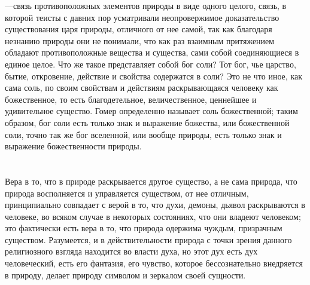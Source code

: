 \documentclass[12pt]{article}
\begin{document}
---связь противоположных элементов природы в виде одного целого, связь, в которой теисты с давних пор усматривали неопровержимое доказательство существования царя природы, отличного от нее самой, так как благодаря незнанию природы они не понимали, что как раз взаимным притяжением обладают противоположные вещества и существа, сами собой соединяющиеся в единое целое. Что же такое представляет собой бог соли? Тот бог, чье царство, бытие, откровение, действие и свойства содержатся в соли? Это не что иное, как сама соль, по своим свойствам и действиям раскрывающаяся человеку как божественное, то есть благодетельное, величественное, ценнейшее и удивительное существо. Гомер определенно называет соль божественной; таким образом, бог соли есть только знак и выражение божества, или божественной соли, точно так же бог вселенной, или вообще природы, есть только знак и выражение божественности природы.



\section{}

Вера в то, что в природе раскрывается другое существо, а не сама природа, что природа восполняется и управляется существом, от нее отличным, принципиально совпадает с верой в то, что духи, демоны, дьявол раскрываются в человеке, во всяком случае в некоторых состояниях, что они владеют человеком; это фактически есть вера в то, что природа одержима чуждым, призрачным существом. Разумеется, и в действительности природа с точки зрения данного религиозного взгляда находится во власти духа, но этот дух есть дух человеческий, есть его фантазия, его чувство, которое бессознательно внедряется в природу, делает природу символом и зеркалом своей сущности.



\section{}
\end{document}
